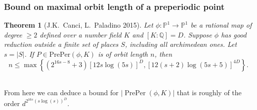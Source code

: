 \documentclass{beamer}
\def\jump{ \quad \\ \vspace{0.7cm} \pause}
\def\PP{{\mathbb P}}
\def\QQ{{\mathbb Q}}
\DeclareMathOperator{\PrePer}{PrePer}
\theoremstyle{thmstyle}
\theoremstyle{thmstyle}
\newtheorem*{mythm}{Theorem}
\theoremstyle{mystyle}
\newtheorem*{remark}{Remark}
\theoremstyle{qstnstyle}
\begin{document}
\begin{frame}
\frametitle{Bound on maximal orbit length of a preperiodic point }
\begin{mythm}[J.K.\ Canci, L.\ Paladino 2015]
Let $\phi : \PP^1\to\PP^1$ be a rational map of degree $\geq{2}$
defined over a number field $K$ and $[K: \mathbb{Q}]=D$. 
Suppose $\phi$ has good reduction outside a finite set of places $S$, including all archimedean ones. Let $s=|S|$.
If $P\in\text{PrePer}(\phi,K)$ is of orbit length $n$, then
$$n\leq \max\left\{(2^{16s-8}+3)\left[12s\log(5s)\right]^{D}, \left[12(s+2)\log(5s+5)\right]^{4D}\right\}
.$$
\end{mythm}
\jump
From here we can deduce a bound for $|\PrePer(\phi,K)| $ that is roughly of the order $\displaystyle d^{2^{16s}\left( s\log(s) \right)^{D}}$.

\end{frame}




%
%
%
%

%
%
\end{document}
